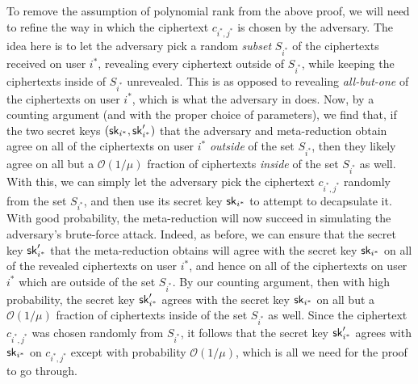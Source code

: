 To remove the assumption of polynomial rank from the above proof,
we will need to refine the way in
which the ciphertext \(c_{i^{*},j^{*}}\) is chosen by the adversary.
The idea here is to let the adversary pick a random \emph{subset}
\(S_{i^{*}}\) of the ciphertexts received on user \(i^{*}\),
revealing every ciphertext outside of \(S_{i^{*}}\),
while keeping the ciphertexts inside of \(S_{i^{*}}\) unrevealed.
This is as opposed to revealing \emph{all-but-one} of the ciphertexts
on user \(i^{*}\), which is what the adversary in \cite{AC:HanLiuGu21} does.
Now, by a counting argument
(and with the proper choice of parameters), we find that,
if the two secret keys \((\mathsf{sk}_{i^{*}},\mathsf{sk}_{i^{*}}')\)
that the adversary and meta-reduction obtain
agree on all of the ciphertexts
on user \(i^{*}\) \emph{outside} of the set \(S_{i^{*}}\),
then they likely agree on all but a \(\mathcal{O}(1/\mu)\) fraction
of ciphertexts \emph{inside} of the set \(S_{i^{*}}\) as well.
With this, we can simply let the adversary pick the
ciphertext \(c_{i^{*},j^{*}}\) randomly from the set \(S_{i^{*}}\),
and then use its secret key \(\mathsf{sk}_{i^{*}}\)
to attempt to decapsulate it.
With good probability,
the meta-reduction will now succeed in simulating
the adversary's brute-force attack.
Indeed, as before,
we can ensure that the secret key \(\mathsf{sk}_{i^{*}}'\)
that the meta-reduction obtains
will agree with the secret key \(\mathsf{sk}_{i^{*}}\)
on all of the revealed ciphertexts on user \(i^{*}\),
and hence on all of the ciphertexts on user \(i^{*}\)
which are outside of the set \(S_{i^{*}}\).
By our counting argument, then with high probability,
the secret key \(\mathsf{sk}_{i^{*}}'\)
agrees with the secret key \(\mathsf{sk}_{i^{*}}\)
on all but a \(\mathcal{O}(1/\mu)\) fraction
of ciphertexts inside of the set \(S_{i^{*}}\) as well.
Since the ciphertext \(c_{i^{*},j^{*}}\)
was chosen randomly from \(S_{i^{*}}\),
it follows that the secret key \(\mathsf{sk}_{i^{*}}'\)
agrees with \(\mathsf{sk}_{i^{*}}\) on \(c_{i^{*},j^{*}}\)
except with probability \(\mathcal{O}(1/\mu)\),
which is all we need for the proof to go through.

